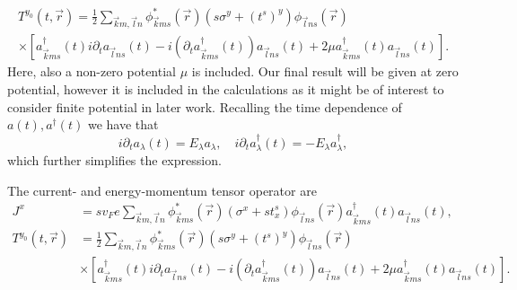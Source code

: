 \begin{multline}
    T^{y_0}(t, \vec{r}) =
    \frac{1}{2}
    \sum\limits_{\vec{k} m, \vec{l} n}^{}
    \phi ^{*}_{\vec{k} m s}(\vec{r}) (s \sigma^y + (t^s)^y) \phi _{\vec{l} n s }(\vec{r})\\
    \times \left[
      a^{\dagger}_{\vec{k} m s}(t) i \partial_t  a_{\vec{l} n s}(t)
      -
      i \left(\partial_t a^{\dagger}_{\vec{k} ms }(t) \right) a_{\vec{l} n s}(t)
      +  2\mu  a^{\dagger}_{\vec{k} m s}(t) a_{\vec{l} n s}(t)
        \right].
\end{multline}
Here, also a non-zero potential $\mu $ is included.
Our final result will be given at zero potential, however it is included in the calculations as it might be of interest to consider finite potential in later work.
Recalling the time dependence of $a(t), a^{\dagger}(t)$ we have that
\[
  i \partial_t a_{\lambda }(t) = E_{\lambda }a_{\lambda },
  \quad
  i \partial_t a^{\dagger}_{\lambda }(t) = -E_{\lambda }a^{\dagger}_{\lambda },
\]
which further simplifies the expression.

\begin{summary}
  The current- and energy-momentum tensor operator are
  \begin{align}
    J^x &= sv_F e \sum\limits_{\vec{k}m, \vec{l}n}^{}
          \phi _{\vec{k}ms}^{*}(\vec{r}) \left(\sigma^x + s t^s_x\right) \phi _{\vec{l}ns}(\vec{r})
          a_{\vec{k}ms}^{\dagger}(t)
          a_{\vec{l}ns}(t),\\
    T^{y_0}(t, \vec{r}) &=
                          \frac{1}{2}
                          \sum\limits_{\vec{k} m, \vec{l} n}^{}
                          \phi ^{*}_{\vec{k} m s}(\vec{r}) (s \sigma^y + (t^s)^y) \phi _{\vec{l} n s }(\vec{r})\\
\nonumber        &\times \left[
          a^{\dagger}_{\vec{k} m s}(t) i \partial_t  a_{\vec{l} n s}(t)
          -
          i \left(\partial_t a^{\dagger}_{\vec{k} ms }(t) \right) a_{\vec{l} n s}(t)
          +  2\mu  a^{\dagger}_{\vec{k} m s}(t) a_{\vec{l} n s}(t)
          \right].
  \end{align}
\end{summary}

